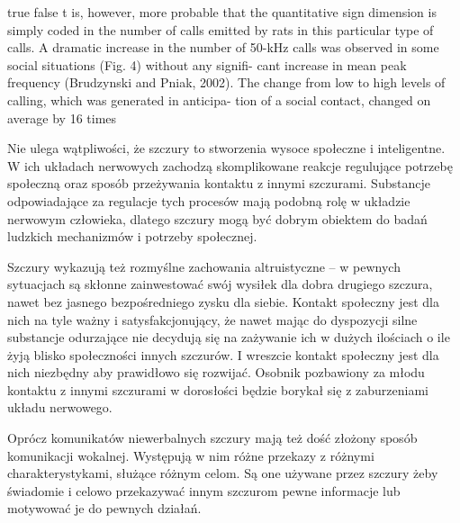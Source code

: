 \documentclass{psychol}
\begin{document}
\ifx true false
t is, however, more
probable that the quantitative sign dimension is
simply coded in the number of calls emitted by rats
in this particular type of calls. A dramatic increase
in the number of 50-kHz calls was observed in
some social situations (Fig. 4) without any signifi-
cant increase in mean peak frequency (Brudzynski
and Pniak, 2002). The change from low to high
levels of calling, which was generated in anticipa-
tion of a social contact, changed on average by 16
times
\fi


Nie ulega wątpliwości, że szczury to stworzenia wysoce społeczne i inteligentne. W ich układach nerwowych zachodzą skomplikowane reakcje regulujące potrzebę społeczną oraz sposób przeżywania kontaktu z innymi szczurami. Substancje odpowiadające za regulacje tych procesów mają podobną rolę w układzie nerwowym człowieka, dlatego szczury mogą być dobrym obiektem do badań ludzkich mechanizmów i potrzeby społecznej.

Szczury wykazują też rozmyślne zachowania altruistyczne -- w pewnych sytuacjach są skłonne zainwestować swój wysiłek dla dobra drugiego szczura, nawet bez jasnego bezpośredniego zysku dla siebie. Kontakt społeczny jest dla nich na tyle ważny i satysfakcjonujący, że nawet mając do dyspozycji silne substancje odurzające nie decydują się na zażywanie ich w dużych ilościach o ile żyją blisko społeczności innych szczurów. I wreszcie kontakt społeczny jest dla nich niezbędny aby prawidłowo się rozwijać. Osobnik pozbawiony za młodu kontaktu z innymi szczurami w dorosłości będzie borykał się z zaburzeniami układu nerwowego.

Oprócz komunikatów niewerbalnych szczury mają też dość złożony sposób komunikacji \colorbox{yellow!30}{wokalnej}. Występują w nim różne przekazy z różnymi charakterystykami, służące różnym celom. Są one używane przez szczury żeby świadomie i celowo przekazywać innym szczurom pewne informacje lub motywować je do pewnych działań.

\pagebreak


\end{document}
